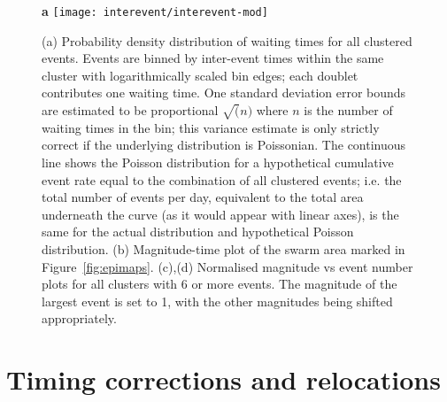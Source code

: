 \documentclass[reviewcopy]{elsart}
\renewcommand{\includegraphics}[2][]{\fbox{#2}}
\begin{document}
\begin{figure}
{\sf \bf a}
\texttt{[image: interevent/interevent-mod]}

\caption{(a) Probability density distribution of waiting  times for all clustered events.  Events are binned by
inter-event times within the same cluster with logarithmically scaled
bin edges; each doublet
contributes one waiting time. One standard deviation error bounds are
estimated to be proportional $\sqrt(n)$ where $n$ is the number of
waiting times in the bin; this variance estimate is only strictly
correct if the underlying distribution is Poissonian.  The continuous
line shows the Poisson distribution for a hypothetical cumulative
event rate equal to the combination of all clustered events; i.e. the
total number of events per day, equivalent to the total area underneath the
curve (as it would appear with linear axes), is the same for the
actual distribution and hypothetical Poisson distribution. (b)
Magnitude-time plot of the swarm area marked in
Figure~\ref{fig:epimaps}. (c),(d) Normalised magnitude vs event number
plots for all clusters with 6 or more events. The magnitude of the
largest event is set to 1, with the other magnitudes being shifted appropriately.}
\label{fig:clust-statistics}
\end{figure}


\clearpage

\appendix
\setcounter{figure}{0}
\renewcommand{\thefigure}{A\arabic{figure}}



\section{Timing corrections and relocations}
\end{document}
